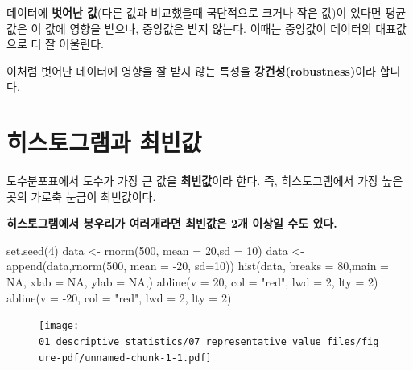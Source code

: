 \documentclass[
  letterpaper,
  DIV=11,
  numbers=noendperiod]{scrreprt}
\newenvironment{Shaded}{\begin{snugshade}}{\end{snugshade}}
\newcommand{\AttributeTok}[1]{\textcolor[rgb]{0.40,0.45,0.13}{#1}}
\newcommand{\ConstantTok}[1]{\textcolor[rgb]{0.56,0.35,0.01}{#1}}
\newcommand{\DecValTok}[1]{\textcolor[rgb]{0.68,0.00,0.00}{#1}}
\newcommand{\FunctionTok}[1]{\textcolor[rgb]{0.28,0.35,0.67}{#1}}
\newcommand{\NormalTok}[1]{\textcolor[rgb]{0.00,0.23,0.31}{#1}}
\newcommand{\OtherTok}[1]{\textcolor[rgb]{0.00,0.23,0.31}{#1}}
\newcommand{\SpecialCharTok}[1]{\textcolor[rgb]{0.37,0.37,0.37}{#1}}
\newcommand{\StringTok}[1]{\textcolor[rgb]{0.13,0.47,0.30}{#1}}
\begin{document}
데이터에 \textbf{벗어난 값}(다른 값과 비교했을때 국단적으로 크거나 작은
값)이 있다면 평균값은 이 값에 영향을 받으나, 중앙값은 받지 않는다.
이때는 중앙값이 데이터의 대표값으로 더 잘 어울린다.

이처럼 벗어난 데이터에 영향을 잘 받지 않는 특성을
\textbf{강건성(robustness)}이라 합니다.

\hypertarget{uxd788uxc2a4uxd1a0uxadf8uxb7a8uxacfc-uxcd5cuxbe48uxac12}{%
\section{히스토그램과
최빈값}\label{uxd788uxc2a4uxd1a0uxadf8uxb7a8uxacfc-uxcd5cuxbe48uxac12}}

도수분포표에서 도수가 가장 큰 값을 \textbf{최빈값}이라 한다. 즉,
히스토그램에서 가장 높은 곳의 가로축 눈금이 최빈값이다.

\textbf{히스토그램에서 봉우리가 여러개라면 최빈값은 2개 이상일 수도
있다.}

\begin{Shaded}
\begin{Highlighting}[]
\FunctionTok{set.seed}\NormalTok{(}\DecValTok{4}\NormalTok{)}
\NormalTok{data }\OtherTok{\textless{}{-}} \FunctionTok{rnorm}\NormalTok{(}\DecValTok{500}\NormalTok{, }\AttributeTok{mean =} \DecValTok{20}\NormalTok{,}\AttributeTok{sd =} \DecValTok{10}\NormalTok{)}
\NormalTok{data }\OtherTok{\textless{}{-}} \FunctionTok{append}\NormalTok{(data,}\FunctionTok{rnorm}\NormalTok{(}\DecValTok{500}\NormalTok{, }\AttributeTok{mean =} \SpecialCharTok{{-}}\DecValTok{20}\NormalTok{, }\AttributeTok{sd=}\DecValTok{10}\NormalTok{))}
\FunctionTok{hist}\NormalTok{(data, }\AttributeTok{breaks =} \DecValTok{80}\NormalTok{,}\AttributeTok{main =} \ConstantTok{NA}\NormalTok{, }\AttributeTok{xlab =} \ConstantTok{NA}\NormalTok{, }\AttributeTok{ylab =} \ConstantTok{NA}\NormalTok{,)}
\FunctionTok{abline}\NormalTok{(}\AttributeTok{v =} \DecValTok{20}\NormalTok{, }\AttributeTok{col =} \StringTok{"red"}\NormalTok{, }\AttributeTok{lwd =} \DecValTok{2}\NormalTok{, }\AttributeTok{lty =} \DecValTok{2}\NormalTok{)}
\FunctionTok{abline}\NormalTok{(}\AttributeTok{v =} \SpecialCharTok{{-}}\DecValTok{20}\NormalTok{, }\AttributeTok{col =} \StringTok{"red"}\NormalTok{, }\AttributeTok{lwd =} \DecValTok{2}\NormalTok{, }\AttributeTok{lty =} \DecValTok{2}\NormalTok{)}
\end{Highlighting}
\end{Shaded}

\begin{figure}[H]

{\centering \texttt{[image: 01\_descriptive\_statistics/07\_representative\_value\_files/figure-pdf/unnamed-chunk-1-1.pdf]}

}

\end{figure}
\end{document}
